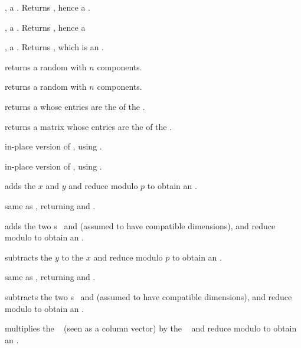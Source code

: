 ,  a . Returns , hence a .

,  a . Returns , hence a 

,  a . Returns , which is an .


 returns a random  with $n$
components.

 returns a random  with $n$
components.

 returns a  whose
entries are the  of the .

 returns a matrix whose
entries are the  of the .

in-place version of , using .

in-place version of , using .

 adds the  $x$ and $y$
and reduce modulo $p$ to obtain an .

 same as , returning and
.

 adds the two s~
and  (assumed to have compatible dimensions), and reduce modulo
 to obtain an .

 subtracts the  $y$ to
the  $x$ and reduce modulo $p$ to obtain an .

 same as , returning and
.

 subtracts the two s~
and  (assumed to have compatible dimensions), and reduce modulo
 to obtain an .

 multiplies the ~
(seen as a column vector) by the ~ and reduce modulo  to
obtain an .

